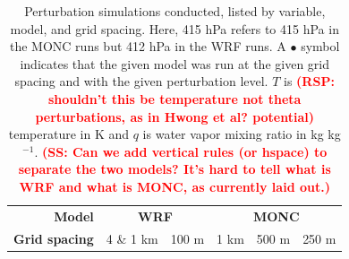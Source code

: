 \documentclass[draft]{agujournal2019}
\newcommand{\todo}[1]{\textcolor{red}{\textbf{(#1)}}}
\begin{document}
{
\begin{table}
    \centering
    \caption{Perturbation simulations conducted, listed by variable, model, and
    grid spacing. Here, 415 hPa refers to 415 hPa in the MONC runs but 412 hPa
    in the WRF runs. A $\bullet{}$ symbol indicates that the given model was run
    at the given grid spacing and with the given perturbation level. $T$ is
    \todo{RSP: shouldn't this be temperature not theta perturbations, as in Hwong et al? potential} temperature in K and $q$ is water vapor mixing ratio in kg
    kg$^{-1}$. \todo{SS: Can we add vertical rules (or hspace) to separate the two models?  It's hard to tell what is WRF and what is MONC, as currently laid out.}}
    \label{tab:pert_runs}
    \renewcommand{\arraystretch}{0.6}
    \footnotesize
    \begin{tabular}{llrccccc}
        \multicolumn{3}{r}{\textbf{Model}} & \multicolumn{2}{c}{\textbf{WRF}} & \multicolumn{3}{c}{\textbf{MONC}} \\
        \multicolumn{3}{r}{\textbf{Grid spacing}} & 4 \& 1 km & 100 m & 1 km & 500 m & 250 m \\
        

\end{tabular}
\end{table}}
\end{document}
